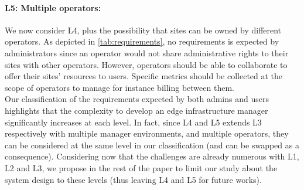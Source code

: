 \paragraph{L5: Multiple operators:}
We now consider L4, plus the possibility that sites can be owned by different
operators. As depicted in \cref{tab:requirements}, no requirements is expected
by administrators since an operator would not share administrative rights to
their sites with other operators. However,
operators should be able to collaborate to offer their sites' resources to
users. Specific metrics should be collected at the scope of operators to
manage for instance billing between them.\\

Our classification of the requirements expected by both admins and users
highlights that the complexity to develop an edge infrastructure manager
significantly increases at each level. In fact, since L4 and L5 extends L3
respectively with multiple manager environments, and multiple operators, they
can be considered at the same level in our classification (and can be swapped
as a consequence).
Considering now that the challenges are already numerous with L1, L2 and L3, we
propose in the rest of the paper to limit our study about the system design to
these levels (thus leaving L4 and L5 for future works).

